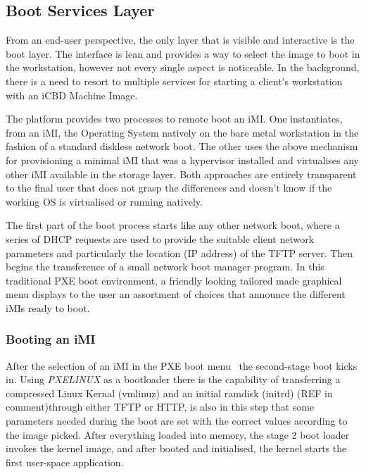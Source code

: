 \subsection{Boot Services Layer}
\label{sub:icbd_architecture_boot}


From an end-user perspective, the only layer that is visible and interactive is the boot layer. The interface is lean and provides a way to select the image to boot in the workstation, however not every single aspect is noticeable. In the background, there is a need to resort to multiple services for starting a client's workstation with an iCBD Machine Image.

The platform provides two processes to remote boot an iMI. One instantiates, from an iMI, the Operating System natively on the bare metal workstation in the fashion of a standard diskless network boot. The other uses the above mechanism for provisioning a minimal iMI that was a hypervisor installed and virtualises any other iMI available in the storage layer. Both approaches are entirely transparent to the final user that does not grasp the differences and doesn't know if the working OS is virtualised or running natively.

The first part of the boot process starts like any other network boot, where a series of DHCP requests are used to provide the suitable client network parameters and particularly the location (IP address) of the TFTP server. Then begins the transference of a small network boot manager program. In this traditional PXE boot environment, a friendly looking tailored made graphical menu displays to the user an assortment of choices that announce the different iMIs ready to boot.

\subsubsection{Booting an iMI}
\label{susub:booting_imi}
After the selection of an iMI in the PXE boot menu~\cite{ibm_linux_boot} the second-stage boot kicks in. Using \textit{PXELINUX} as a bootloader there is the capability of transferring a compressed Linux Kernal (vmlinuz) and an initial ramdisk (initrd) (REF in comment)through either TFTP or HTTP, is also in this step that some parameters needed during the boot are set with the correct values according to the image picked. After everything loaded into memory, the stage 2 boot loader invokes the kernel image, and after booted and initialised, the kernel starts the first user-space application. 


